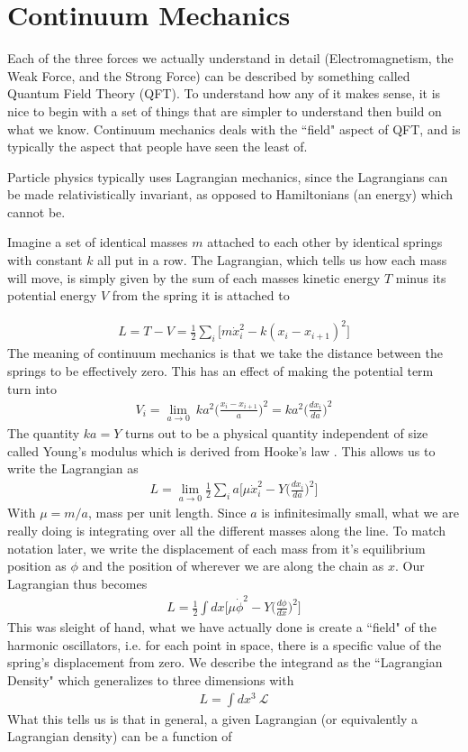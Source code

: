 \section{Continuum Mechanics}
Each of the three forces we actually understand in detail (Electromagnetism, the Weak Force, and the Strong Force) can be described by something called Quantum Field Theory (QFT). To understand how any of it makes sense, it is nice to begin with a set of things that are simpler to understand then build on what we know. Continuum mechanics deals with the ``field" aspect of QFT, and is typically the aspect that people have seen the least of. 

Particle physics typically uses Lagrangian mechanics, since the Lagrangians can be made relativistically invariant, as opposed to  Hamiltonians (an energy) which cannot be.

Imagine a set of identical masses $m$ attached to each other by identical springs with constant $k$ all put in a row. The Lagrangian, which tells us how each mass will move, is simply given by the sum of each masses kinetic energy $T$ minus its potential energy $V$ from the spring it is attached to

\begin{align}
    L = T - V = \frac{1}{2}\sum_i \Big[m \dot{x}_i^2 - k(x_i - x_{i+1})^2\Big]
\end{align}
The meaning of continuum mechanics is that we take the distance between the springs to be effectively zero. This has an effect of making the potential term turn into
\begin{align}
    V_i =\lim_{a\to 0} ~k a^2 \Big(\frac{x_i - x_{i+1}}{a}\Big)^2 = ka^2 \Big(\frac{d x_i}{d a}\Big)^2
\end{align}
The quantity $ka = Y$ turns out to be a physical quantity independent of size called Young's modulus which is derived from Hooke's law \cite{goldstein}. This allows us to write the Lagrangian as 
\begin{align}
    L = \lim_{a\to 0} \frac{1}{2}\sum_i a\Big[\mu \dot{x}_i^2 - Y\Big(\frac{d x_i}{d a}\Big)^2\Big]
\end{align}
With $\mu = m/a$, mass per unit length. Since $a$ is infinitesimally small, what we are really doing is integrating over all the different masses along the line. To match notation later, we write the displacement of each mass from it's equilibrium position as $\phi$ and the position of wherever we are along the chain as $x$. Our Lagrangian thus becomes
\begin{align}
    L = \frac{1}{2}\int dx \Big[\mu \dot{\phi}^2 - Y\Big(\frac{d\phi}{d x}\Big)^2\Big]
\end{align}
This was sleight of hand, what we have actually done is create a ``field" of the harmonic oscillators, i.e. for each point in space, there is a specific value of the spring's displacement from zero. We describe the integrand as the ``Lagrangian Density" which generalizes to three dimensions with
\begin{align}
    L = \int dx^3 ~\mathcal{L}
\end{align}
What this tells us is that in general, a given Lagrangian (or equivalently a Lagrangian density) can be a function of

